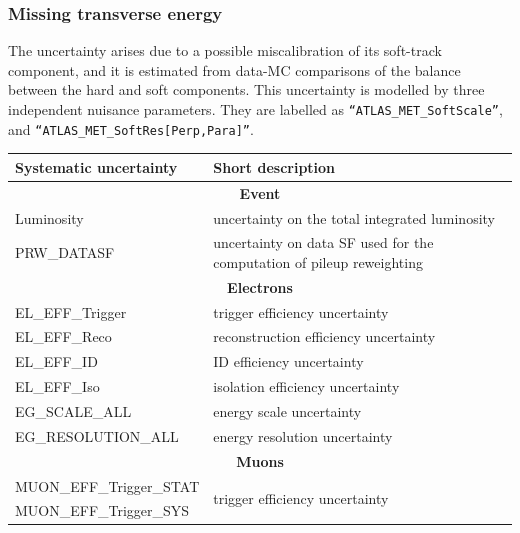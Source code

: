 \subsubsection{Missing transverse energy}

The  \MET uncertainty arises due to a possible miscalibration of its soft-track component, and it is estimated from data-MC comparisons of the \pT balance between the hard and soft \MET components. This uncertainty  is modelled by three independent nuisance parameters. They are labelled as  \texttt{``ATLAS\_MET\_SoftScale''}, and  \texttt{``ATLAS\_MET\_SoftRes[Perp,Para]''}.



\begin{table}[h]
  \centering
  \scriptsize
  \begin{center}
    \begin{tabular}{ll}
      \toprule \midrule
      Systematic uncertainty        & Short description                                                                          \\ \midrule
      \multicolumn{2}{c}{\textbf{Event}}  \\ \midrule
      Luminosity  & uncertainty on the total integrated luminosity  \\
       \midrule
       PRW\_DATASF         & uncertainty on data SF used for the computation of pileup reweighting      \\
       \midrule
       \multicolumn{2}{c}{\textbf{Electrons}}  \\ \midrule
       EL\_EFF\_Trigger   & trigger efficiency uncertainty    \\
       EL\_EFF\_Reco    & reconstruction efficiency uncertainty          \\ 
       EL\_EFF\_ID    & ID efficiency uncertainty               \\ 
       EL\_EFF\_Iso   & isolation efficiency uncertainty       \\
       EG\_SCALE\_ALL & energy scale uncertainty  \\ 
       EG\_RESOLUTION\_ALL & energy resolution uncertainty  \\ \midrule
       \multicolumn{2}{c}{\textbf{Muons}}  \\ \midrule
       MUON\_EFF\_Trigger\_STAT        & \multirow{ 2}{*}{trigger efficiency uncertainty}        \\ %
       MUON\_EFF\_Trigger\_SYS        &        \\ 

\end{tabular}
\end{center}
\end{table}
